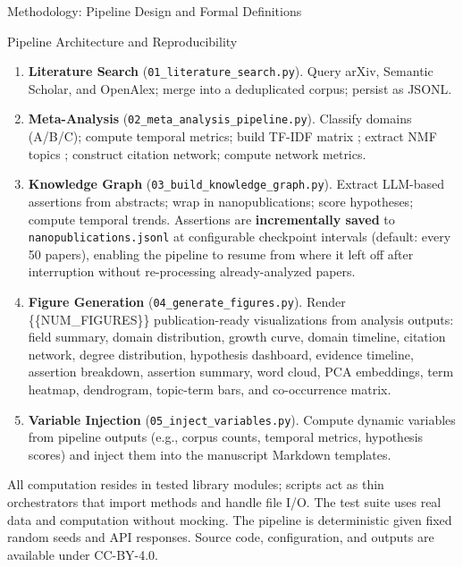 \documentclass[
  ignorenonframetext,
]{beamer}
\begin{document}
\begin{frame}[fragile]{Methodology: Pipeline Design and Formal
Definitions}
\begin{block}{Pipeline Architecture and Reproducibility}
\begin{enumerate}
\item
  \textbf{Literature Search} (\texttt{01\_literature\_search.py}). Query
  arXiv, Semantic Scholar, and OpenAlex; merge into a deduplicated
  corpus; persist as JSONL.
\item
  \textbf{Meta-Analysis} (\texttt{02\_meta\_analysis\_pipeline.py}).
  Classify domains (A/B/C); compute temporal metrics; build TF-IDF
  matrix \citep{salton1975vector}; extract NMF topics
  \citep{lee1999nmf}; construct citation network; compute network
  metrics.
\item
  \textbf{Knowledge Graph} (\texttt{03\_build\_knowledge\_graph.py}).
  Extract LLM-based assertions from abstracts; wrap in nanopublications;
  score hypotheses; compute temporal trends. Assertions are
  \textbf{incrementally saved} to \texttt{nanopublications.jsonl} at
  configurable checkpoint intervals (default: every 50 papers), enabling
  the pipeline to resume from where it left off after interruption
  without re-processing already-analyzed papers.
\item
  \textbf{Figure Generation} (\texttt{04\_generate\_figures.py}). Render
  \{\{NUM\_FIGURES\}\} publication-ready visualizations from analysis
  outputs: field summary, domain distribution, growth curve, domain
  timeline, citation network, degree distribution, hypothesis dashboard,
  evidence timeline, assertion breakdown, assertion summary, word cloud,
  PCA embeddings, term heatmap, dendrogram, topic-term bars, and
  co-occurrence matrix.
\item
  \textbf{Variable Injection} (\texttt{05\_inject\_variables.py}).
  Compute dynamic variables from pipeline outputs (e.g., corpus counts,
  temporal metrics, hypothesis scores) and inject them into the
  manuscript Markdown templates.
\end{enumerate}

All computation resides in tested library modules; scripts act as thin
orchestrators that import methods and handle file I/O. The test suite
uses real data and computation without mocking. The pipeline is
deterministic given fixed random seeds and API responses. Source code,
configuration, and outputs are available under CC-BY-4.0.
\end{block}
\end{frame}
\end{document}
